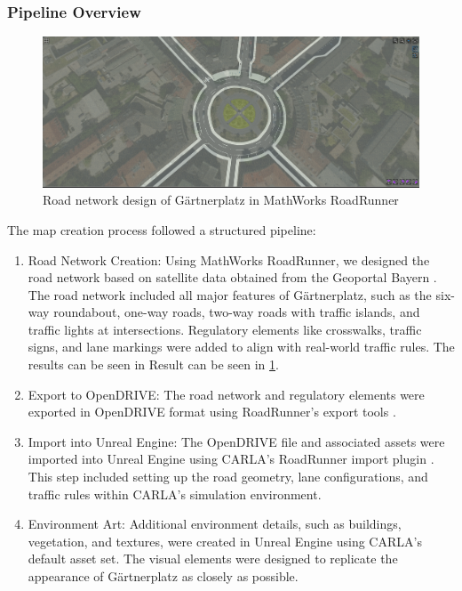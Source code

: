 \subsubsection*{Pipeline Overview}
\begin{figure}
    \centering
    \includegraphics[width=\textwidth]{figures/roadrunner.png}
    \caption{Road network design of Gärtnerplatz in MathWorks RoadRunner}
    \label{fig:roadrunner}
\end{figure}
The map creation process followed a structured pipeline:
\begin{enumerate}
    \item Road Network Creation: Using MathWorks RoadRunner, we designed the road network based on satellite data obtained from the Geoportal Bayern \cite{geoportal_bayern}. The road network included all major features of Gärtnerplatz, such as the six-way roundabout, one-way roads, two-way roads with traffic islands, and traffic lights at intersections. Regulatory elements like crosswalks, traffic signs, and lane markings were added to align with real-world traffic rules. The results can be seen in Result can be seen in \ref{fig:roadrunner}.
    \item Export to OpenDRIVE: The road network and regulatory elements were exported in OpenDRIVE format using RoadRunner's export tools \cite{mathworks_roadrunner}.
    \item Import into Unreal Engine: The OpenDRIVE file and associated assets were imported into Unreal Engine using CARLA's RoadRunner import plugin \cite{carla_map_import}. This step included setting up the road geometry, lane configurations, and traffic rules within CARLA's simulation environment.
    \item Environment Art: Additional environment details, such as buildings, vegetation, and textures, were created in Unreal Engine using CARLA's default asset set. The visual elements were designed to replicate the appearance of Gärtnerplatz as closely as possible.
\end{enumerate}

